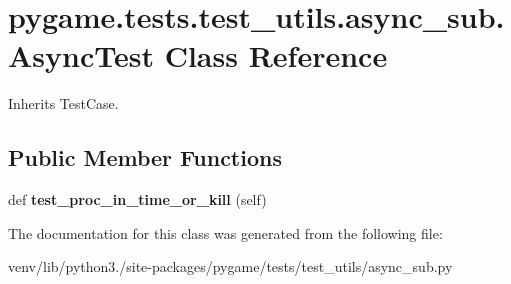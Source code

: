 \hypertarget{classpygame_1_1tests_1_1test__utils_1_1async__sub_1_1_async_test}{}\section{pygame.\+tests.\+test\+\_\+utils.\+async\+\_\+sub.\+Async\+Test Class Reference}
\label{classpygame_1_1tests_1_1test__utils_1_1async__sub_1_1_async_test}


Inherits Test\+Case.

\subsection*{Public Member Functions}
\begin{DoxyCompactItemize}
\item 
\mbox{\label{classpygame_1_1tests_1_1test__utils_1_1async__sub_1_1_async_test_a7e5a61c4f2137a796a53ae19dc035a4a}} 
def {\bfseries test\+\_\+proc\+\_\+in\+\_\+time\+\_\+or\+\_\+kill} (self)
\end{DoxyCompactItemize}


The documentation for this class was generated from the following file\+:\begin{DoxyCompactItemize}
\item 
venv/lib/python3./site-\/packages/pygame/tests/test\+\_\+utils/async\+\_\+sub.\+py\end{DoxyCompactItemize}
